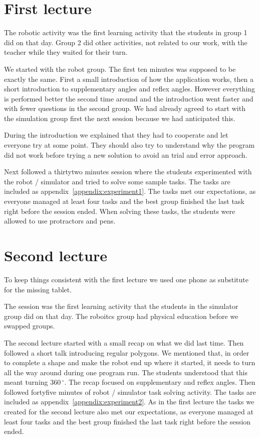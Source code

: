 \section{First lecture}
The robotic activity was the first learning activity that the students in group 1 did on that day. 
Group 2 did other activities, not related to our work, with the teacher  while they waited for their turn.

\bigskip\noindent
We started with the robot group. The first ten minutes was supposed to be exactly the same. First a small introduction of how the application works, then a short introduction to supplementary angles and reflex angles. However everything is performed better the second time around and the introduction went faster and with fewer questions in the second group. We had already agreed to start with the simulation group first the next session because we had anticipated this.

\bigskip\noindent
During the introduction we explained that they had to cooperate and let everyone try at some point. They should also try to understand why the program did not work before trying a new solution to avoid an trial and error approach.

\bigskip\noindent
Next followed a thirtytwo minutes session where the students experimented with the robot / simulator and tried to solve some sample tasks. The tasks are included as appendix~\ref{appendix:experiment1}.
The tasks met our expectations, as everyone managed at least four tasks and the best group finished the last task right before the session ended. When solving these tasks, the students were allowed to use protractors and pens. 

\section{Second lecture}
To keep things consistent with the first lecture we used one phone as substitute for the missing tablet.

\bigskip\noindent
The session was the first learning activity that the students in the simulator group did on that day. 
The roboitcs group had physical education before we swapped groups.

\bigskip\noindent
The second lecture started with a small recap on what we did last time. Then followed a short talk introducing regular polygons. We mentioned that, in order to complete a shape and make the robot end up where it started, it needs to turn all the way around during one program run. The students understood that this meant turning $360\,^{\circ}$. The recap focused on supplementary and reflex angles. Then followed fortyfive minutes of robot / simulator task solving activity. The tasks are included as appendix~\ref{appendix:experiment2}.
As in the first lecture the tasks we created for the second lecture also met our expectations, as everyone managed at least four tasks and the best group finished the last task right before the session ended. 